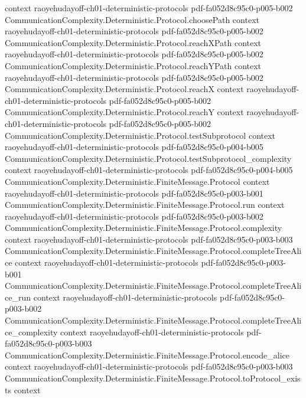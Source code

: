 \begin{lemma}
  {context}
  {raoyehudayoff-ch01-deterministic-protocols}
  {pdf-fa052d8c95c0-p005-b002}
\proofstep
  {CommunicationComplexity.Deterministic.Protocol.choosePath}
  {context}
  {raoyehudayoff-ch01-deterministic-protocols}
  {pdf-fa052d8c95c0-p005-b002}
\proofstep
  {CommunicationComplexity.Deterministic.Protocol.reachXPath}
  {context}
  {raoyehudayoff-ch01-deterministic-protocols}
  {pdf-fa052d8c95c0-p005-b002}
\proofstep
  {CommunicationComplexity.Deterministic.Protocol.reachYPath}
  {context}
  {raoyehudayoff-ch01-deterministic-protocols}
  {pdf-fa052d8c95c0-p005-b002}
\proofstep
  {CommunicationComplexity.Deterministic.Protocol.reachX}
  {context}
  {raoyehudayoff-ch01-deterministic-protocols}
  {pdf-fa052d8c95c0-p005-b002}
\proofstep
  {CommunicationComplexity.Deterministic.Protocol.reachY}
  {context}
  {raoyehudayoff-ch01-deterministic-protocols}
  {pdf-fa052d8c95c0-p005-b002}
\proofstep
  {CommunicationComplexity.Deterministic.Protocol.testSubprotocol}
  {context}
  {raoyehudayoff-ch01-deterministic-protocols}
  {pdf-fa052d8c95c0-p004-b005}
\proofstep
  {CommunicationComplexity.Deterministic.Protocol.testSubprotocol_complexity}
  {context}
  {raoyehudayoff-ch01-deterministic-protocols}
  {pdf-fa052d8c95c0-p004-b005}
\proofstep
  {CommunicationComplexity.Deterministic.FiniteMessage.Protocol}
  {context}
  {raoyehudayoff-ch01-deterministic-protocols}
  {pdf-fa052d8c95c0-p003-b001}
\proofstep
  {CommunicationComplexity.Deterministic.FiniteMessage.Protocol.run}
  {context}
  {raoyehudayoff-ch01-deterministic-protocols}
  {pdf-fa052d8c95c0-p003-b002}
\proofstep
  {CommunicationComplexity.Deterministic.FiniteMessage.Protocol.complexity}
  {context}
  {raoyehudayoff-ch01-deterministic-protocols}
  {pdf-fa052d8c95c0-p003-b003}
\proofstep
  {CommunicationComplexity.Deterministic.FiniteMessage.Protocol.completeTreeAlice}
  {context}
  {raoyehudayoff-ch01-deterministic-protocols}
  {pdf-fa052d8c95c0-p003-b001}
\proofstep
  {CommunicationComplexity.Deterministic.FiniteMessage.Protocol.completeTreeAlice_run}
  {context}
  {raoyehudayoff-ch01-deterministic-protocols}
  {pdf-fa052d8c95c0-p003-b002}
\proofstep
  {CommunicationComplexity.Deterministic.FiniteMessage.Protocol.completeTreeAlice_complexity}
  {context}
  {raoyehudayoff-ch01-deterministic-protocols}
  {pdf-fa052d8c95c0-p003-b003}
\proofstep
  {CommunicationComplexity.Deterministic.FiniteMessage.Protocol.encode_alice}
  {context}
  {raoyehudayoff-ch01-deterministic-protocols}
  {pdf-fa052d8c95c0-p003-b003}
\proofstep
  {CommunicationComplexity.Deterministic.FiniteMessage.Protocol.toProtocol_exists}
  {context}

\end{lemma}
